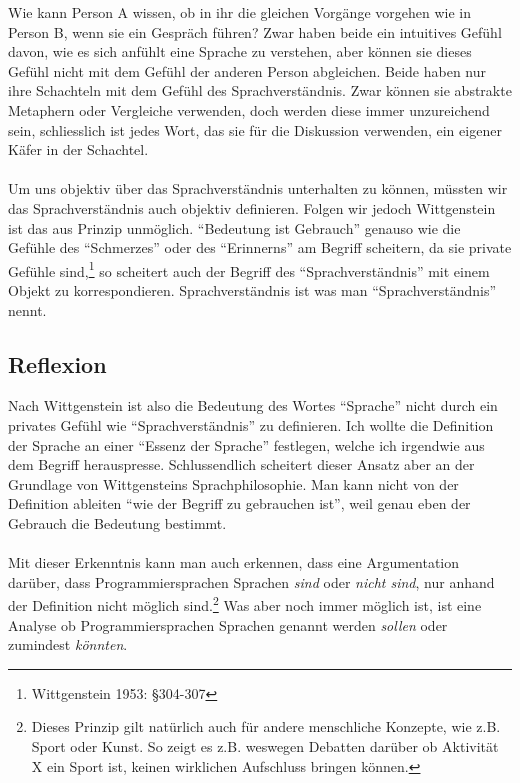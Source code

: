 \documentclass[10pt,a4paper]{article}
\begin{document}
Wie kann Person A wissen, ob in ihr die gleichen Vorgänge vorgehen wie in Person B, wenn sie ein Gespräch führen? 
Zwar haben beide ein intuitives Gefühl davon, wie es sich anfühlt eine Sprache zu verstehen, aber können sie dieses Gefühl nicht mit dem Gefühl der anderen Person abgleichen. Beide haben nur ihre Schachteln mit dem Gefühl des Sprachverständnis. Zwar können sie abstrakte Metaphern oder Vergleiche verwenden, doch werden diese immer unzureichend sein, schliesslich ist jedes Wort, das sie für die Diskussion verwenden, ein eigener Käfer in der Schachtel. \\ \\
Um uns objektiv über das Sprachverständnis unterhalten zu können, müssten wir das Sprachverständnis auch objektiv definieren. Folgen wir jedoch Wittgenstein ist das aus Prinzip unmöglich. \enquote{Bedeutung ist Gebrauch} genauso wie die Gefühle des \enquote{Schmerzes} oder des \enquote{Erinnerns} am Begriff scheitern, da sie private Gefühle sind,\footnote{Wittgenstein 1953: §304-307} so scheitert auch der Begriff des \enquote{Sprachverständnis} mit einem Objekt zu korrespondieren. Sprachverständnis ist was man \enquote{Sprachverständnis} nennt. \\


\subsection{Reflexion}
Nach Wittgenstein ist also die Bedeutung des Wortes \enquote{Sprache} nicht durch ein privates Gefühl wie \enquote{Sprachverständnis} zu definieren. Ich wollte die  Definition der Sprache an einer \enquote{Essenz der Sprache} festlegen, welche ich irgendwie aus dem Begriff herauspresse. Schlussendlich scheitert dieser Ansatz aber an der Grundlage von Wittgensteins Sprachphilosophie. Man kann nicht von der Definition ableiten \enquote{wie der Begriff zu gebrauchen ist}, weil genau eben der Gebrauch die Bedeutung bestimmt. \\
\\
Mit dieser Erkenntnis kann man auch erkennen, dass eine Argumentation darüber, dass Programmiersprachen Sprachen \textit{sind} oder \textit{nicht sind}, nur anhand der Definition nicht möglich sind.\footnote{Dieses Prinzip gilt natürlich auch für andere menschliche Konzepte, wie z.B. Sport oder Kunst. So zeigt es z.B. weswegen Debatten darüber ob Aktivität X ein Sport ist, keinen wirklichen Aufschluss bringen können.} Was aber noch immer möglich ist, ist eine Analyse ob Programmiersprachen Sprachen genannt werden \textit{sollen} oder zumindest \textit{könnten}.
\end{document}
